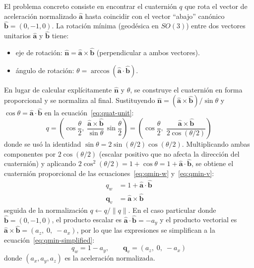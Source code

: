 El problema concreto consiste en encontrar el cuaternión $q$ que rota el
vector de aceleración normalizado $\hat{\mathbf{a}}$ hasta coincidir con el
vector ``abajo'' canónico $\hat{\mathbf{b}} = (0, -1, 0)$. La rotación
mínima (geodésica en $SO(3)$) entre dos vectores unitarios
$\hat{\mathbf{a}}$ y $\hat{\mathbf{b}}$ tiene:
\begin{itemize}
  \item eje de rotación: $\hat{\mathbf{n}} = \hat{\mathbf{a}} \times \hat{\mathbf{b}}$
        (perpendicular a ambos vectores).
  \item ángulo de rotación: $\theta = \arccos(\hat{\mathbf{a}} \cdot \hat{\mathbf{b}})$.
\end{itemize}
En lugar de calcular explícitamente $\hat{\mathbf{n}}$ y $\theta$, se construye
el cuaternión en forma proporcional y se normaliza al final. Sustituyendo
$\hat{\mathbf{n}} = (\hat{\mathbf{a}} \times \hat{\mathbf{b}})/\sin\theta$
y $\cos\theta = \hat{\mathbf{a}} \cdot \hat{\mathbf{b}}$ en la
ecuación~\ref{eq:quat-unit}:
\begin{equation}
  q = \left(\cos\frac{\theta}{2},\;
      \frac{\hat{\mathbf{a}} \times \hat{\mathbf{b}}}{\sin\theta}\,
      \sin\frac{\theta}{2}\right)
  = \left(\cos\frac{\theta}{2},\;
      \frac{\hat{\mathbf{a}} \times \hat{\mathbf{b}}}{2\cos(\theta/2)}\right)
\end{equation}
donde se usó la identidad $\sin\theta = 2\sin(\theta/2)\cos(\theta/2)$.
Multiplicando ambas componentes por $2\cos(\theta/2)$ (escalar positivo que
no afecta la dirección del cuaternión) y aplicando
$2\cos^2(\theta/2) = 1 + \cos\theta = 1 + \hat{\mathbf{a}} \cdot \hat{\mathbf{b}}$,
se obtiene el cuaternión proporcional de las ecuaciones~\ref{eq:qmin-w}
y~\ref{eq:qmin-v}:
\begin{align}
  q_w        &= 1 + \hat{\mathbf{a}} \cdot \hat{\mathbf{b}} \label{eq:qmin-w}\\
  \mathbf{q}_v &= \hat{\mathbf{a}} \times \hat{\mathbf{b}}  \label{eq:qmin-v}
\end{align}
seguida de la normalización $q \leftarrow q / \|q\|$. En el caso particular
donde $\hat{\mathbf{b}} = (0, -1, 0)$, el producto escalar es
$\hat{\mathbf{a}} \cdot \hat{\mathbf{b}} = -a_y$ y el producto vectorial es
$\hat{\mathbf{a}} \times \hat{\mathbf{b}} = (a_z,\; 0,\; -a_x)$,
por lo que las expresiones se simplifican a la ecuación~\ref{eq:qmin-simplified}:
\begin{equation}
  \label{eq:qmin-simplified}
  q_w = 1 - a_y, \qquad
  \mathbf{q}_v = (a_z,\; 0,\; -a_x)
\end{equation}
donde $(a_x, a_y, a_z)$ es la aceleración normalizada.

